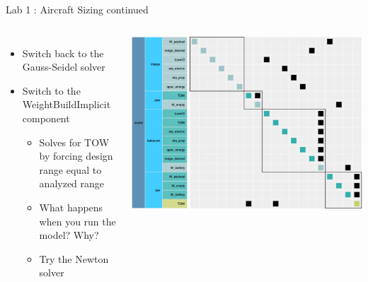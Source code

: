 \documentclass[aspectratio=169, usenames,dvipsnames, 14pt]{beamer}
\begin{document}
\begin{frame}{Lab 1 : Aircraft Sizing continued}
    \begin{columns}
    \hspace{-1cm}
    
            \begin{itemize}
                \item Switch back to the Gauss-Seidel solver
                
                \vspace{0.25cm}
                \item Switch to the WeightBuildImplicit component

                    \begin{itemize}
                        \item Solves for TOW by forcing design range equal to analyzed range
                        \item What happens when you run the model? Why?
                        \item Try the Newton solver
                    \end{itemize}
            \end{itemize}
            
            \includegraphics[scale=0.24]{images/slide_68_image.PNG}
    \end{columns}
\end{frame}
    
\end{document}

